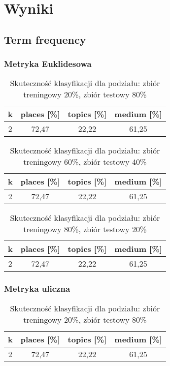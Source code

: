 \documentclass{classrep}
\begin{document}
\section{Wyniki}
\subsection{Term frequency}
\subsubsection{Metryka Euklidesowa}
\begin{table}[H]
	\centering
	\begin{tabular}{c c c c} 
		\hline
		\textbf{k} & \textbf{places [\%]} & \textbf{topics [\%]} &  \textbf{medium [\%]} \\ [0.5ex] 
		\hline
		\hline 
			2 & 72,47 & 22,22 & 61,25 \\ 
		\hline
	\end{tabular}
	\caption{Skuteczność klasyfikacji dla podziału: zbiór treningowy 20\%, zbiór testowy 80\%}
\end{table}

\begin{table}[H]
	\centering
	\begin{tabular}{c c c c} 
		\hline
		\textbf{k} & \textbf{places [\%]} & \textbf{topics [\%]} &  \textbf{medium [\%]} \\ [0.5ex] 
		\hline
		\hline 
			2 & 72,47 & 22,22 & 61,25 \\ 
		\hline
	\end{tabular}
	\caption{Skuteczność klasyfikacji dla podziału: zbiór treningowy 60\%, zbiór testowy 40\%}
\end{table}

\begin{table}[H]
	\centering
	\begin{tabular}{c c c c} 
		\hline
		\textbf{k} & \textbf{places [\%]} & \textbf{topics [\%]} &  \textbf{medium [\%]} \\ [0.5ex] 
		\hline
		\hline 
			2 & 72,47 & 22,22 & 61,25 \\ 
		\hline
	\end{tabular}
	\caption{Skuteczność klasyfikacji dla podziału: zbiór treningowy 80\%, zbiór testowy 20\%}
\end{table}

\subsubsection{Metryka uliczna}
\begin{table}[H]
	\centering
	\begin{tabular}{c c c c} 
		\hline
		\textbf{k} & \textbf{places [\%]} & \textbf{topics [\%]} &  \textbf{medium [\%]} \\ [0.5ex] 
		\hline
		\hline 
			2 & 72,47 & 22,22 & 61,25 \\ 
		\hline
	\end{tabular}
	\caption{Skuteczność klasyfikacji dla podziału: zbiór treningowy 20\%, zbiór testowy 80\%}
\end{table}
\end{document}
